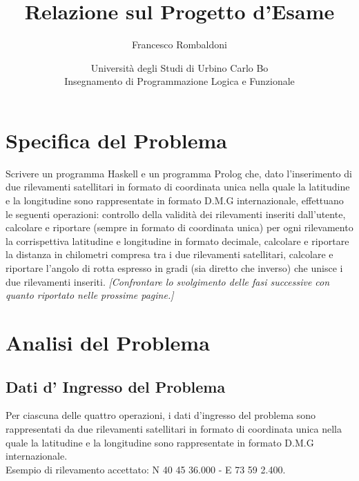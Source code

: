 \documentclass{article}
\title{\textbf{Relazione sul Progetto d'Esame}}
\author{Francesco Rombaldoni}
\date{\small Università degli Studi di Urbino Carlo Bo\\
	Insegnamento di Programmazione Logica e Funzionale}
\begin{document}
	\maketitle
	
	

\section{Specifica del Problema}
Scrivere un programma Haskell e un programma Prolog che, dato l'inserimento di due rilevamenti satellitari in formato di coordinata unica nella quale la latitudine e la longitudine sono rappresentate in formato D.M.G internazionale, effettuano le seguenti operazioni: controllo della validità dei rilevamenti inseriti dall'utente, calcolare e riportare (sempre in formato di coordinata unica) per ogni rilevamento la corrispettiva latitudine e longitudine in formato decimale, calcolare e riportare la distanza in chilometri compresa tra i due rilevamenti satellitari, calcolare e riportare l'angolo di rotta espresso in gradi (sia diretto che inverso) che unisce i due rilevamenti inseriti.
\newline
\newline
\emph{[Confrontare lo svolgimento delle fasi successive con quanto riportato nelle prossime pagine.]}\\
\newpage
			
\section{Analisi del Problema}
\subsection{Dati d' Ingresso del Problema}
Per ciascuna delle quattro operazioni, i dati d'ingresso del problema sono rappresentati da due rilevamenti satellitari in formato di coordinata unica nella quale la latitudine e la longitudine sono rappresentate in formato D.M.G internazionale. \\
Esempio di rilevamento accettato: N 40 45 36.000 - E 73 59 2.400.
\end{document}
